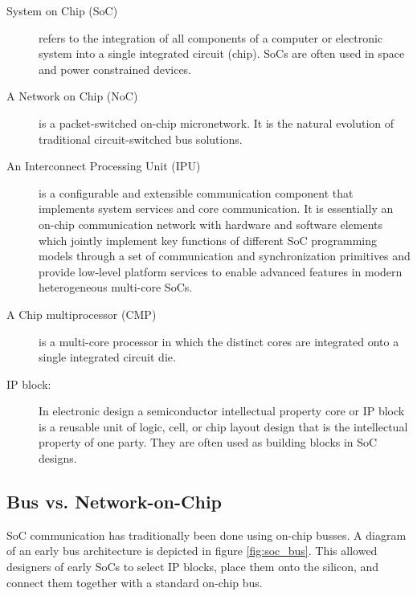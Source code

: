 \begin{description}

\item[System on Chip (SoC)] 
	
refers to the integration of all components of a computer or electronic system into a single integrated circuit (chip). SoCs are often used in space and power constrained devices.
	
\item[A Network on Chip (NoC)] 

is a packet-switched on-chip micronetwork. 
It is the natural evolution of traditional circuit-switched bus solutions. 
	
\item[An Interconnect Processing Unit (IPU)] 
	
is a configurable and extensible communication component that implements system services and core communication. 
It is essentially an on-chip communication network with hardware and software elements which jointly implement key functions of different SoC programming models through a set of communication and synchronization primitives and provide low-level platform services to enable advanced features in modern heterogeneous multi-core SoCs.\cite{coppola2008design}

\item[A Chip multiprocessor (CMP)] 

is a multi-core processor in which the distinct cores are integrated onto a single integrated circuit die.

\item[IP block:] 
	
In electronic design a semiconductor intellectual property core or IP block is a reusable unit of logic, cell, or chip layout design that is the intellectual property of one party. 
They are often used as building blocks in SoC designs.

\end{description}

\subsection{Bus vs. Network-on-Chip}\label{S:busvsnoc}

SoC communication has traditionally been done using on-chip busses. 
A diagram of an early bus architecture is depicted in figure \ref{fig:soc_bus}. 
This allowed designers of early SoCs to select IP blocks, place them onto the silicon, and connect them together with a standard on-chip bus.

